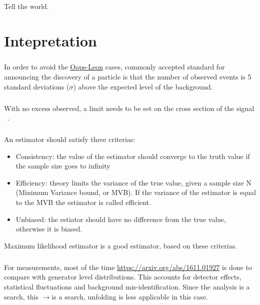 \begin{savequote}[75mm]
Tell the world.
\end{savequote}

\chapter{Intepretation}

\paragraph{}
In order to avoid the \href{https://en.wikipedia.org/wiki/Oops-Leon}{Oops-Leon} cases, commonly accepted standard for announcing the discovery of a particle is that the number of observed events is 5 standard deviations ($\sigma$) above the expected level of the background.

\paragraph{}
With no excess observed, a limit needs to be set on the cross section of the signal ~\cite{Stat-asym}. 

\paragraph{}
An estimator should satisfy three criterias:
\begin{itemize}
	\item Consistency: the value of the estimator should converge to the truth value if the sample size goes to infinity
	\item Efficiency: theory limits the variance of the true value, given a sample size N (Minimum Variance bound, or MVB). If the variance of the estimator is equal to the MVB the estimator is called efficient.
	\item Unbiased: the estiator should have no difference from the true value, otherwise it is biased.
\end{itemize}
Maximum likelihood estimator is a good estimator, based on these criterias.

\paragraph{}
For measurements, most of the time \href{unfolding}{https://arxiv.org/abs/1611.01927} is done to compare with generator level distributions. This accounts for detector effects, statistical fluctuations and background mis-identification. Since the analysis is a search, this \hh$\to$\fourb is a search, unfolding is less applicable in this case.